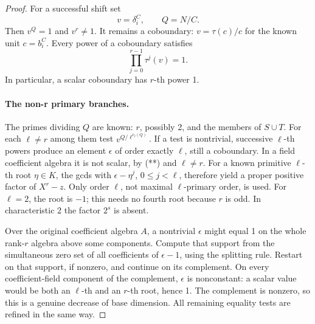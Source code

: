 \documentclass[11pt]{article}
\theoremstyle{definition}
\theoremstyle{remark}
\begin{document}
\begin{proof}
For a successful shift set
\[
 v=\delta_i^C,\qquad Q=N/C.
\]
Then \(v^Q=1\) and \(v^r\ne1\). It remains a coboundary:
\(v=\tau(c)/c\) for the known unit \(c=b_i^C\). Every power
of a coboundary satisfies
\[
                      \prod_{j=0}^{r-1}\tau^j(v)=1.       \tag{**}
\]
In particular, a scalar coboundary has \(r\)-th power 1.

\paragraph{The non-r primary branches.}
The primes dividing \(Q\) are known: \(r\), possibly 2, and
the members of \(S\cup T\). For each \(\ell\ne r\) among
them test \(v^{Q/\ell^{v_\ell(Q)}}\). If a test is nontrivial,
successive \(\ell\)-th powers produce an element \(\epsilon\)
of order exactly \(\ell\), still a coboundary. In a field
coefficient algebra it is not scalar, by (**) and \(\ell\ne r\).
For a known primitive \(\ell\)-th root \(\eta\in K\),
the gcds with \(\epsilon-\eta^j\), \(0\le j<\ell\),
therefore yield a proper positive factor of \(X^r-z\).
Only order \(\ell\), not maximal \(\ell\)-primary order, is used.
For \(\ell=2\), the root is \(-1\); this needs no fourth root
because \(r\) is odd. In characteristic 2 the factor \(2^s\)
is absent.

Over the original coefficient algebra \(A\), a nontrivial
\(\epsilon\) might equal 1 on the whole rank-\(r\) algebra
above some components. Compute that support from the simultaneous
zero set of all coefficients of \(\epsilon-1\), using the
splitting rule. Restart on that support, if nonzero, and continue
on its complement. On every coefficient-field component of the
complement, \(\epsilon\) is nonconstant: a scalar value would
be both an \(\ell\)-th and an \(r\)-th root, hence 1.
The complement is nonzero, so this is a genuine decrease of base
dimension. All remaining equality tests are refined in the same way.


\end{proof}
\end{document}
